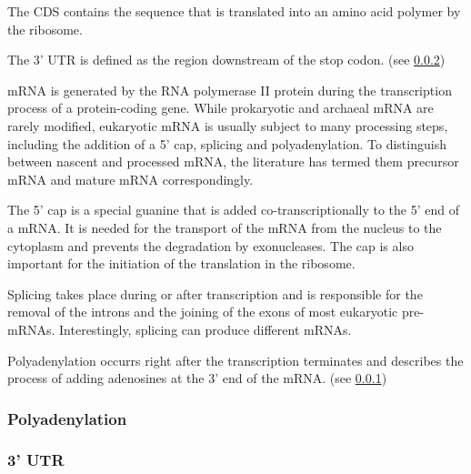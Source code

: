 The CDS contains the sequence that is translated into an amino acid polymer by the ribosome.

The 3' UTR is defined as the region downstream of the stop codon. (see \ref{3_UTR})

mRNA is generated by the RNA polymerase II protein during the transcription process of a protein-coding gene. While prokaryotic and archaeal mRNA are rarely modified, eukaryotic mRNA is usually subject to many processing steps, including the addition of a 5' cap, splicing and polyadenylation. To distinguish between nascent and processed mRNA, the literature has termed them precursor mRNA and mature mRNA correspondingly.

The 5' cap is a special guanine that is added co-transcriptionally to the 5' end of a mRNA. It is needed for the transport of the mRNA from the nucleus to the cytoplasm and prevents the degradation by exonucleases. The cap is also important for the initiation of the translation in the ribosome. 

Splicing takes place during or after transcription and is responsible for the removal of the introns and the joining of the exons of most eukaryotic pre-mRNAs. Interestingly, splicing can produce different mRNAs. 

Polyadenylation occurrs right after the transcription terminates and describes the process of adding adenosines at the 3' end of the mRNA. (see \ref{polyadenylation})

\subsubsection{Polyadenylation}
\label{polyadenylation}
\subsubsection{3' UTR}
\label{3_UTR}
